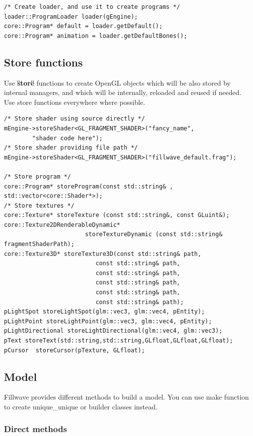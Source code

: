 \documentclass{article}
\begin{document}
\begin{lstlisting}
/* Create loader, and use it to create programs */
loader::ProgramLoader loader(gEngine);
core::Program* default = loader.getDefault();
core::Program* animation = loader.getDefaultBones();
\end{lstlisting}

\subsection{Store functions}\label{sec:store functions}
\indent \indent Use \textbf{\"store\"} functions to create OpenGL objects which will be also stored by internal managers, and which will be internally, reloaded and reused if needed. Use store functions everywhere where possible.

\begin{lstlisting}
/* Store shader using source directly */
mEngine->storeShader<GL_FRAGMENT_SHADER>("fancy_name",
		"shader code here");
/* Store shader providing file path */
mEngine->storeShader<GL_FRAGMENT_SHADER>("fillwave_default.frag");

/* Store program */
core::Program* storeProgram(const std::string& , std::vector<core::Shader*>);
/* Store textures */
core::Texture* storeTexture (const std::string&, const GLuint&);
core::Texture2DRenderableDynamic* 
                       storeTextureDynamic (const std::string& fragmentShaderPath);
core::Texture3D* storeTexture3D(const std::string& path,
                          const std::string& path,
                          const std::string& path,
                          const std::string& path,
                          const std::string& path,
                          const std::string& path);
pLightSpot storeLightSpot(glm::vec3, glm::vec4, pEntity);
pLightPoint storeLightPoint(glm::vec3, glm::vec4, pEntity);
pLightDirectional storeLightDirectional(glm::vec4, glm::vec3);
pText storeText(std::string,std::string,GLfloat,GLfloat,GLfloat);
pCursor  storeCursor(pTexture, GLfloat);
\end{lstlisting}

\newpage

\subsection{Model}\label{sec:Model}
\indent \indent Fillwave provides different methods to build a model. You can use make function to create unique\_unique or builder classes instead.

\subsubsection{Direct methods}\label{sec:directCreation}
\end{document}
